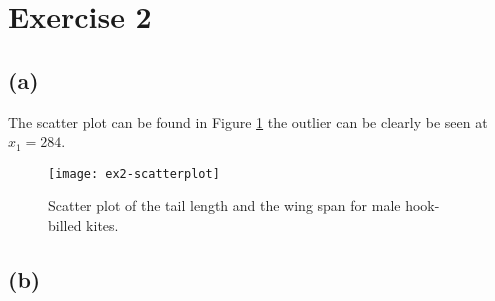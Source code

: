 \section*{Exercise 2}
\label{sec:exercise-2}

\subsection*{(a)}
\label{sec:a-1}

The scatter plot can be found in Figure \ref{fig:ex2-scatter} the outlier can be
clearly be seen at $x_1 = 284$.
\begin{figure}[h]
  \centering
  \texttt{[image: ex2-scatterplot]}
  \caption{Scatter plot of the tail length and the wing span for male
    hook-billed kites.}
  \label{fig:ex2-scatter}
\end{figure}

\subsection*{(b)}
\label{sec:b-1}

